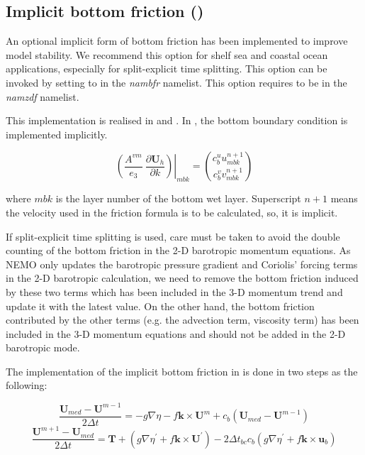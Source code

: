 \documentclass[../main/NEMO_manual]{subfiles}
\begin{document}
\subsection{Implicit bottom friction (\protect{})}
\label{subsec:ZDF_bfr_imp}

An optional implicit form of bottom friction has been implemented to improve model stability.
We recommend this option for shelf sea and coastal ocean applications, especially for split-explicit time splitting.
This option can be invoked by setting  to  in the \textit{nambfr} namelist.
This option requires  to be  in the \textit{namzdf} namelist. 

This implementation is realised in  and . In ,
the bottom boundary condition is implemented implicitly.

\[
  \left.{\left( {\frac{A^{vm} }{e_3 }\ \frac{\partial \textbf{U}_h}{\partial k}} \right)} \right|_{mbk}
  = \binom{c_{b}^{u}u^{n+1}_{mbk}}{c_{b}^{v}v^{n+1}_{mbk}}
\]

where $mbk$ is the layer number of the bottom wet layer.
Superscript $n+1$ means the velocity used in the friction formula is to be calculated, so, it is implicit.

If split-explicit time splitting is used, care must be taken to avoid the double counting of the bottom friction in
the 2-D barotropic momentum equations.
As NEMO only updates the barotropic pressure gradient and Coriolis' forcing terms in the 2-D barotropic calculation,
we need to remove the bottom friction induced by these two terms which has been included in the 3-D momentum trend 
and update it with the latest value.
On the other hand, the bottom friction contributed by the other terms
(e.g. the advection term, viscosity term) has been included in the 3-D momentum equations and
should not be added in the 2-D barotropic mode.

The implementation of the implicit bottom friction in  is done in two steps as the following:

\[
  \frac{\textbf{U}_{med}-\textbf{U}^{m-1}}{2\Delta t}=-g\nabla\eta-f\textbf{k}\times\textbf{U}^{m}+c_{b}
  \left(\textbf{U}_{med}-\textbf{U}^{m-1}\right)
\]
\[
  \frac{\textbf{U}^{m+1}-\textbf{U}_{med}}{2\Delta t}=\textbf{T}+
  \left(g\nabla\eta^{'}+f\textbf{k}\times\textbf{U}^{'}\right)-
  2\Delta t_{bc}c_{b}\left(g\nabla\eta^{'}+f\textbf{k}\times\textbf{u}_{b}\right)
\]
\end{document}
